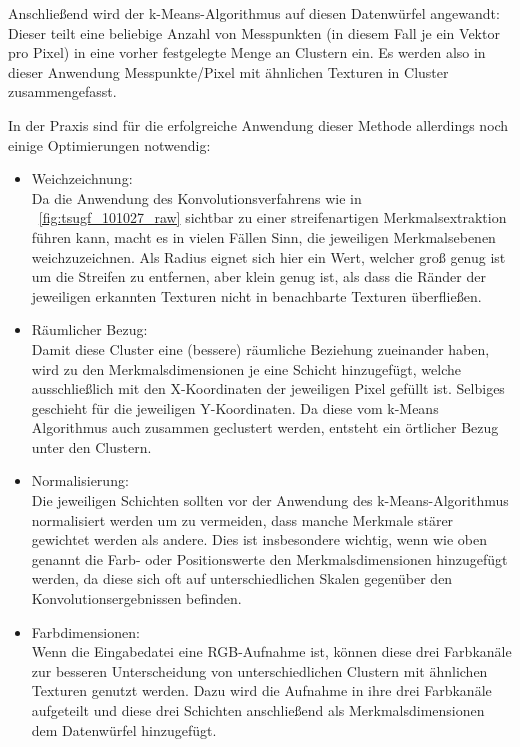 Anschließend wird der k-Means-Algorithmus auf diesen Datenwürfel angewandt: Dieser teilt eine beliebige Anzahl von Messpunkten (in diesem Fall je ein Vektor pro Pixel) in eine vorher festgelegte Menge an Clustern ein. Es werden also in dieser Anwendung Messpunkte/Pixel mit ähnlichen Texturen in Cluster zusammengefasst.

In der Praxis sind für die erfolgreiche Anwendung dieser Methode allerdings noch einige Optimierungen notwendig: \cite{mathworks_15}

\begin{itemize}
	\item Weichzeichnung:\\
Da die Anwendung des Konvolutionsverfahrens wie in \figurename~\ref{fig:tsugf_101027_raw} sichtbar zu einer streifenartigen Merkmalsextraktion führen kann, macht es in vielen Fällen Sinn, die jeweiligen Merkmalsebenen weichzuzeichnen. Als Radius eignet sich hier ein Wert, welcher groß genug ist um die Streifen zu entfernen, aber klein genug ist, als dass die Ränder der jeweiligen erkannten Texturen nicht in benachbarte Texturen überfließen.
	\item Räumlicher Bezug:\\
Damit diese Cluster eine (bessere) räumliche Beziehung zueinander haben, wird zu den Merkmalsdimensionen je eine Schicht hinzugefügt, welche ausschließlich mit den X-Koordinaten der jeweiligen Pixel gefüllt ist. Selbiges geschieht für die jeweiligen Y-Koordinaten. Da diese vom k-Means Algorithmus auch zusammen geclustert werden, entsteht ein örtlicher Bezug unter den Clustern.
	\item Normalisierung:\\
Die jeweiligen Schichten sollten vor der Anwendung des k-Means-Algorithmus normalisiert werden um zu vermeiden, dass manche Merkmale stärer gewichtet werden als andere. Dies ist insbesondere wichtig, wenn wie oben genannt die Farb- oder Positionswerte den Merkmalsdimensionen hinzugefügt werden, da diese sich oft auf unterschiedlichen Skalen gegenüber den Konvolutionsergebnissen befinden.
	\item Farbdimensionen:\\
Wenn die Eingabedatei eine RGB-Aufnahme ist, können diese drei Farbkanäle zur besseren Unterscheidung von unterschiedlichen Clustern mit ähnlichen Texturen genutzt werden. Dazu wird die Aufnahme in ihre drei Farbkanäle aufgeteilt und diese drei Schichten anschließend als Merkmalsdimensionen dem Datenwürfel hinzugefügt.
\end{itemize}

